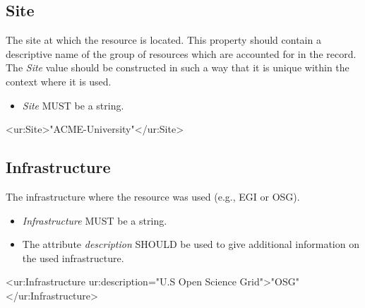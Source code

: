 


\subsection{Site}

The site at which the resource is located. This property should contain a descriptive name of the group of resources which are accounted for in the record. The \emph{Site} value should be constructed in such a way that it is unique within the context where it is used.
\begin{itemize}
\item \emph{Site} MUST be a string.
\end{itemize}

\begin{XMLexample}
<ur:Site>"ACME-University"</ur:Site>
\end{XMLexample}






\subsection{Infrastructure}

The infrastructure where the resource was used (e.g., EGI or OSG).
\begin{itemize}
\item \emph{Infrastructure} MUST be a string.
\item The attribute \emph{description} SHOULD be used to give additional information on the used infrastructure.
\end{itemize}

\begin{XMLexample}
<ur:Infrastructure ur:description="U.S Open Science Grid">"OSG"</ur:Infrastructure>
\end{XMLexample}
